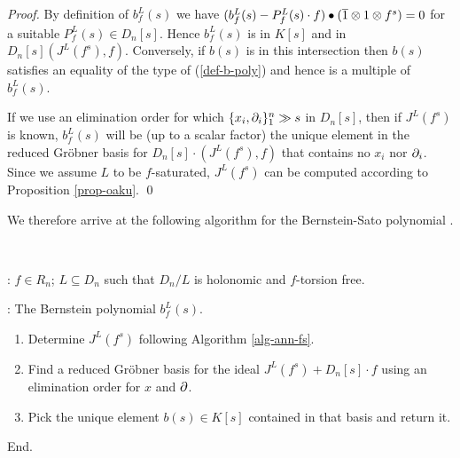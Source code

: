 \begin{proof}
By definition of $b^L_f(s)$ we have
$(b_f^L(s)-P_f^L(s)\cdot f)\bullet (\overline{1}\otimes 1\otimes f^s)=0$ for
a suitable $P^L_f(s)\in D_n[s]$. Hence
$b_f^L(s)$ is in $K[s]$ and in 
$D_n[s](J^L(f^s),f)$. Conversely, if $b(s)$ is in this intersection
then $b(s)$ satisfies an equality of the type of (\ref{def-b-poly}) and
hence is a multiple of $b^L_f(s)$.

If we use 
an elimination order for which $\{x_i,\partial_i\}_1^n\gg s$ in $D_n[s]$, then
if $J^L(f^s)$ is known, 
$b^L_f(s)$ will be (up to a scalar 
factor) the unique element in the reduced Gr\"obner basis for
$D_n[s]\cdot (J^L(f^s),f)$ that 
contains no $x_i$ nor $\partial_i$. Since we assume $L$ to be
$f$-saturated,  $J^L(f^s)$ can be computed
according to Proposition \ref{prop-oaku}. 
\qed
\end{proof}

We therefore arrive at the following algorithm for the Bernstein-Sato
polynomial \cite{DM:Oa}.

\begin{alg}~

: $f\in R_n$; $ L\subseteq D_n$ such that 
$D_n/L$ is holonomic and
$f$-torsion free. 

: The Bernstein polynomial $b^L_f(s)$.
\begin{enumerate}
\item Determine $J^L(f^s)$ following Algorithm \ref{alg-ann-fs}. 

\item Find a reduced Gr\"obner basis for the ideal
$J^L(f^s)+D_n[s]\cdot f$ 
using an elimination order for $x$ and $\partial$. 

\item Pick the unique element $b(s)\in K[s]$ contained in that basis and
return it.
\end{enumerate}
End.
\end{alg}

